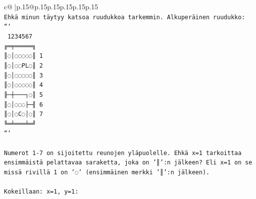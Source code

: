 \documentclass{article}
\begin{document}
{\begin{supertabular}{c@{$\;$}|p{.15\linewidth}@{}p{.15\linewidth}p{.15\linewidth}p{.15\linewidth}p{.15\linewidth}p{.15\linewidth}}
{{{\\ 
\texttt{Ehkä minun täytyy katsoa ruudukkoa tarkemmin. Alkuperäinen ruudukko:} \\
\texttt{```} \\
\texttt{ 1234567} \\
\texttt{╔═╤═════╗} \\
\texttt{║◌│◌◌◌◌◌║ 1} \\
\texttt{║◌│◌◌PL◌║ 2} \\
\texttt{║◌│◌◌◌◌◌║ 3} \\
\texttt{║◌│◌◌◌◌◌║ 4} \\
\texttt{╟─┼───┐◌║ 5} \\
\texttt{║◌│◌◌◌├─╢ 6} \\
\texttt{║◌│◌C◌│◌║ 7} \\
\texttt{╚═╧═══╧═╝} \\
\texttt{```} \\
\\ 
\texttt{Numerot 1{-}7 on sijoitettu reunojen yläpuolelle. Ehkä x=1 tarkoittaa ensimmäistä pelattavaa saraketta, joka on '║':n jälkeen? Eli x=1 on se missä rivillä 1 on '◌' (ensimmäinen merkki '║':n jälkeen).} \\
\\ 
\texttt{Kokeillaan: x=1, y=1:} \\
            }
        }
    }
     \\ \\


\end{supertabular}}
\end{document}
